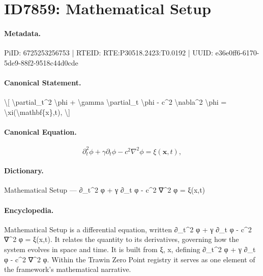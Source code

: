 \section*{ID7859: Mathematical Setup}
\paragraph{Metadata.}
PiID: 6725253256753 | RTEID: RTE:P30518.2423:T0.0192 | UUID: e36e0ff6-6170-5de9-88f2-9518c44d0cde

\paragraph{Canonical Statement.}
\textbackslash{}[ \textbackslash{}partial\_t\textasciicircum{}2 \textbackslash{}phi + \textbackslash{}gamma \textbackslash{}partial\_t \textbackslash{}phi - c\textasciicircum{}2 \textbackslash{}nabla\textasciicircum{}2 \textbackslash{}phi = \textbackslash{}xi(\textbackslash{}mathbf\{x\},t), \textbackslash{}]

\paragraph{Canonical Equation.}
\[
\partial_t^2 \phi + \gamma \partial_t \phi - c^2 \nabla^2 \phi = \xi(\mathbf{x},t),
\]

\paragraph{Dictionary.}
Mathematical Setup — ∂\_t\textasciicircum{}2 φ + γ ∂\_t φ - c\textasciicircum{}2 ∇\textasciicircum{}2 φ = ξ(x,t)

\paragraph{Encyclopedia.}
Mathematical Setup is a differential equation, written ∂\_t\textasciicircum{}2 φ + γ ∂\_t φ - c\textasciicircum{}2 ∇\textasciicircum{}2 φ = ξ(x,t). It relates the quantity to its derivatives, governing how the system evolves in space and time. It is built from ξ, x, defining ∂\_t\textasciicircum{}2 φ + γ ∂\_t φ - c\textasciicircum{}2 ∇\textasciicircum{}2 φ. Within the Trawin Zero Point registry it serves as one element of the framework's mathematical narrative.
